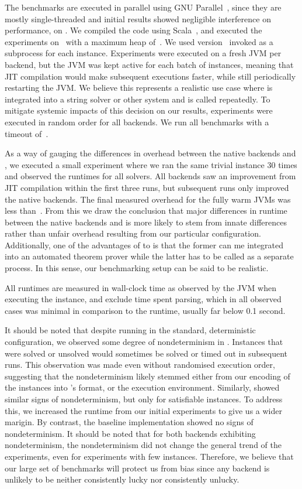 \documentclass[acmsmall,review,anonymous,screen]{acmart}\settopmatter{printfolios=true,printccs=false,printacmref=true}
\theoremstyle{definition}
\begin{document}
The benchmarks are executed in parallel using GNU Parallel~\cite{parallel},
since they are mostly single-threaded and initial results showed negligible
interference on performance, on \BenchmarkRig{}. We compiled the code using
Scala~\ScalaVersion{}, and executed the experiments on~\JvmVersion{} with a
maximum heap of~\MaxHeapSize{}. We used \Nuxmv{} version~\NuxmvVersion{} invoked
as a subprocess for each instance. Experiments were executed on a fresh JVM per
backend, but the JVM was kept active for each batch of \BatchSize{} instances,
meaning that JIT compilation would make subsequent executions faster, while
still periodically restarting the JVM. We believe this represents a realistic
use case where \Calculus{} is integrated into a string solver or other system
and is called repeatedly. To mitigate systemic impacts of this decision on our
results, experiments were executed in random order for all backends. We run all
benchmarks with a timeout of~\RuntimeTimeout{}.

As a way of gauging the differences in overhead between the native backends and
\Nuxmv, we executed a small experiment where we ran the same trivial instance 30
times and observed the runtimes for all solvers. All backends saw an improvement
from JIT compilation within the first three runs, but subsequent runs only
improved the native backends. The final measured overhead for the fully warm
JVMs was less than~\OverheadSeconds. From this we draw the conclusion that major
differences in runtime between the native backends and \Nuxmv{} is more likely
to stem from innate differences rather than unfair overhead resulting from our
particular configuration. Additionally, one of the advantages of \Calculus{} to
\Nuxmv{} is that the former can me integrated into an automated theorem prover
while the latter has to be called as a separate process. In this sense, our
benchmarking setup can be said to be realistic.

All runtimes are measured in wall-clock time as observed by the JVM when executing the instance, and exclude time spent parsing, which in all observed cases was minimal in comparison to the runtime, usually far below 0.1 second.

It should be noted that despite running in the standard, deterministic
configuration, we observed some degree of nondeterminism in \Nuxmv. Instances
that were solved or unsolved would sometimes be solved or timed out in
subsequent runs. This observation was made even without randomised execution
order, suggesting that the nondeterminism likely stemmed either from our
encoding of the instances into \Nuxmv's format, or the execution environment.
Similarly, \Calculus{} showed similar signs of nondeterminism, but only for
satisfiable instances. To address this, we increased the runtime from our
initial experiments to give us a wider marigin. By contrast, the baseline
implementation showed no signs of nondeterminism. It should be noted that for
both backends exhibiting nondeterminism, the nondeterminism did not change the
general trend of the experiments, even for experiments with few instances.
Therefore, we believe that our large set of benchmarks will protect us from bias
since any backend is unlikely to be neither consistently lucky nor consistently
unlucky.
\end{document}
